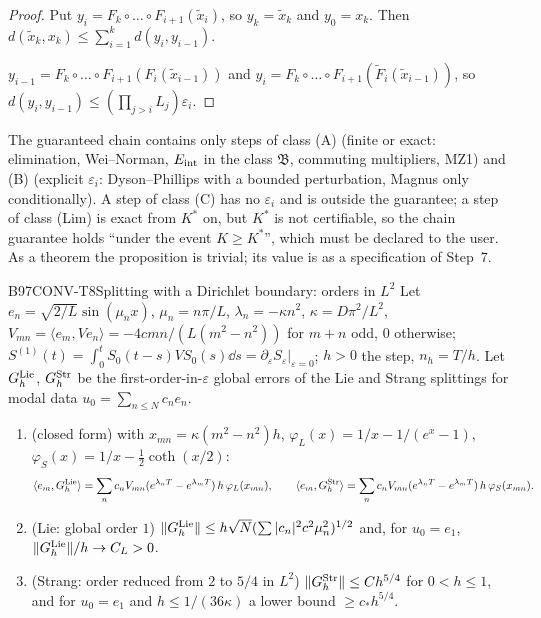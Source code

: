 \begin{proof}
Put $y_i=F_k\circ\dots\circ F_{i+1}(\tilde x_i)$, so $y_k=\tilde x_k$ and $y_0=x_k$. Then $d(\tilde x_k,x_k)\le\sum_{i=1}^kd(y_i,y_{i-1})$.

$y_{i-1}=F_k\circ\dots\circ F_{i+1}(F_i(\tilde x_{i-1}))$ and $y_i=F_k\circ\dots\circ F_{i+1}(\tilde F_i(\tilde x_{i-1}))$, so $d(y_i,y_{i-1})\le(\prod_{j>i}L_j)\varepsilon_i$.

\end{proof}

\begin{caution}[title=Use in the contract]
The guaranteed chain contains only steps of class (A) (finite or exact: elimination, Wei--Norman, $E_{\rm int}$ in the class $\mathfrak B$, commuting multipliers, MZ1) and (B) (explicit $\varepsilon_i$: Dyson--Phillips with a bounded perturbation, Magnus only conditionally). A step of class (C) has no $\varepsilon_i$ and is outside the guarantee; a step of class (Lim) is exact from $K^*$ on, but $K^*$ is not certifiable, so the chain guarantee holds ``under the event $K\ge K^*$'', which must be declared to the user. As a theorem the proposition is trivial; its value is as a specification of Step~7.
\end{caution}

\begin{dimcard}{B97}{CONV-T8}{Splitting with a Dirichlet boundary: orders in $L^2$}{\proved}{}
Let $e_n=\sqrt{2/L}\sin(\mu_nx)$, $\mu_n=n\pi/L$, $\lambda_n=-\kappa n^2$, $\kappa=D\pi^2/L^2$, $V_{mn}=\langle e_m,Ve_n\rangle=-4cmn/(L(m^2-n^2))$ for $m+n$ odd, $0$ otherwise; $S^{(1)}(t)=\int_0^tS_0(t-s)VS_0(s)\dd s=\partial_\varepsilon S_\varepsilon|_{\varepsilon=0}$; $h>0$ the step, $n_h=T/h$. Let $G_h^{\rm Lie}$, $G_h^{\rm Str}$ be the first-order-in-$\varepsilon$ global errors of the Lie and Strang splittings for modal data $u_0=\sum_{n\le N}c_ne_n$.
\begin{enumerate}[label=(\alph*)]
\item (closed form) with $x_{mn}=\kappa(m^2-n^2)h$, $\varphi_L(x)=1/x-1/(e^x-1)$, $\varphi_S(x)=1/x-\frac12\coth(x/2)$:
\[
\langle e_m,G_h^{\rm Lie}\rangle=\sum_nc_nV_{mn}(e^{\lambda_nT}-e^{\lambda_mT})\,h\,\varphi_L(x_{mn}),\qquad \langle e_m,G_h^{\rm Str}\rangle=\sum_nc_nV_{mn}(e^{\lambda_nT}-e^{\lambda_mT})\,h\,\varphi_S(x_{mn}).
\]
\item (Lie: global order $1$) $\|G_h^{\rm Lie}\|\le h\sqrt N(\sum|c_n|^2c^2\mu_n^2)^{1/2}$ and, for $u_0=e_1$, $\|G_h^{\rm Lie}\|/h\to C_L>0$.
\item (Strang: order reduced from $2$ to $5/4$ in $L^2$) $\|G_h^{\rm Str}\|\le Ch^{5/4}$ for $0<h\le1$, and for $u_0=e_1$ and $h\le1/(36\kappa)$ a lower bound $\ge c_*h^{5/4}$.
\end{enumerate}
\end{dimcard}

